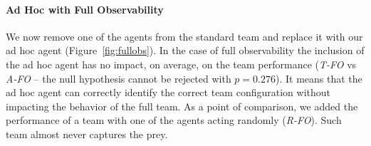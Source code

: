 
\paragraph{Ad Hoc with Full Observability}

We now remove one of the agents from the standard team and replace it with our ad hoc agent (Figure~\ref{fig:fullobs}). In the case of full observability the inclusion of the ad hoc agent has no impact, on average, on the team performance (\emph{T-FO} vs \emph{A-FO} -- the null hypothesis cannot be rejected with {\small$p=0.276$}). It means that the ad hoc agent can correctly identify the correct team configuration without impacting the behavior of the full team. As a point of comparison, we added the performance of a team with one of the agents acting randomly (\emph{R-FO}). Such team almost never captures the prey.


